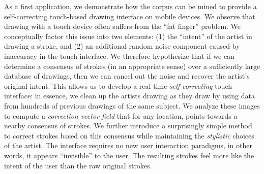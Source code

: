 As a first application, we demonstrate how the \daf corpus can be
mined to provide a self-correcting touch-based drawing interface on
mobile devices. We observe that drawing with a touch device often
suffers from the ``fat finger'' problem. We conceptually factor this issue
into two elements: (1) the ``intent'' of the artist in drawing a
stroke, and (2) an additional random noise component caused by
inaccuracy in the touch interface. We therefore hypothesize that if
we can determine a consensus of strokes (in an appropriate sense)
over a sufficiently large database of drawings, then we can cancel
out the noise and recover the artist's original intent. This allows
us to develop a real-time {\em self-correcting} touch interface: in
essence, we clean up the artists drawing as they draw by using data
from hundreds of previous drawings of the same subject. We analyze
these images to compute a \emph{correction vector field} that for any location,
points towards a nearby consensus of strokes. We further introduce a surprisingly simple
method to correct strokes based on this consensus while maintaining
the {\em stylistic} choices of the artist. The interface requires no new user
interaction paradigms, in other words, it appears
``invisible'' to the user. The resulting strokes feel more like the intent of the user
than the raw original strokes.

%













